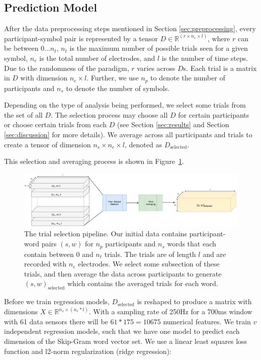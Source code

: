 \subsection{Prediction Model}
After the data preprocessing steps mentioned in Section \ref{sec:preprocessing}, every participant-symbol pair is represented by a tensor $D \in \mathbb{R}^{(r \times n_e \times l)}$, where $r$ can be between $0 \ldots n_t$, $n_t$ is the maximum number of possible trials seen for a given symbol, $n_e$ is the total number of electrodes, and $l$ is the number of time steps. Due to the randomness of the paradigm, $r$ varies across $D$s. Each trial is a matrix in $D$ with dimension $n_e \times l$. Further, we use $n_p$ to denote the number of participants and $n_s$ to denote the number of symbols. 

Depending on the type of analysis being performed, we select some trials from the set of all $D$. The selection process may choose all $D$ for certain participants or choose certain trials from each $D$ (see Section \ref{sec:results} and Section \ref{sec:discussion} for more details). We average across all participants and trials to create a tensor of dimension $n_s \times n_e \times l$, denoted as $D_\text{selected}$.  

This selection and averaging process is shown in Figure~\ref{fig:selection}.

\begin{figure}[t]
 \centerline{
   \includegraphics[width=\linewidth]{figures/selection}
 }
 \caption{The trial selection pipeline. Our initial data contains participant-word pairs $(s, w)$ for $n_p$ participants and $n_s$ words that each contain between 0 and $n_t$ trials. The trials are of length $l$ and are recorded with $n_e$ electrodes. We select some subsection of these trials, and then average the data across participants to generate $(s, w)_{\text{selected}}$ which contains the averaged trials for each word.}
 \label{fig:selection}
\end{figure}

Before we train regression models, $D_{\text{selected}}$ is reshaped to produce a matrix with dimensions $X \in \mathbb{R}^{n_s \times (n_e * l)}$.  With a sampling rate of 250Hz for a 700ms window with 61 data sensors there will be $61*175 = 10675$ numerical features. We train $v$ independent regression models, such that we have one model to predict each dimension of the Skip-Gram word vector set. We use a linear least squares loss function and l2-norm regularization (ridge regression):

